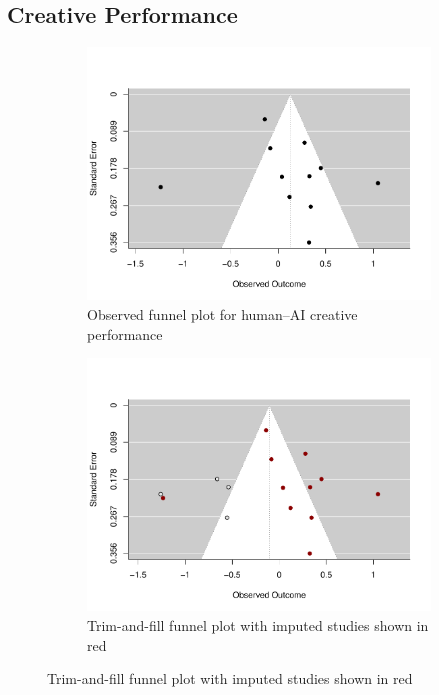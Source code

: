 \documentclass[acmsmall,authorversion]{acmart}
\begin{document}
\subsection{Creative Performance}
\begin{figure}[H]
  \centering
  \begin{subfigure}[b]{0.49\linewidth}
    \centering
    \includegraphics[width=\linewidth]{plot_performance_funnel_observed}
    \caption{Observed funnel plot for human–AI creative performance}
  \end{subfigure}%
  \begin{subfigure}[b]{0.49\linewidth}
    \centering
    \includegraphics[width=\linewidth]{plot_performance_funnel_trimfill}
    \caption{Trim-and-fill funnel plot with imputed studies shown in red}

\end{subfigure}
\end{figure}
\end{document}
